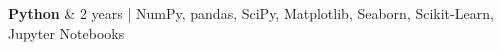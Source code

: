 \textbf{Python} & 
2 years | 
NumPy, 
pandas, 
SciPy, 
Matplotlib, 
Seaborn, 
Scikit-Learn, 
Jupyter Notebooks